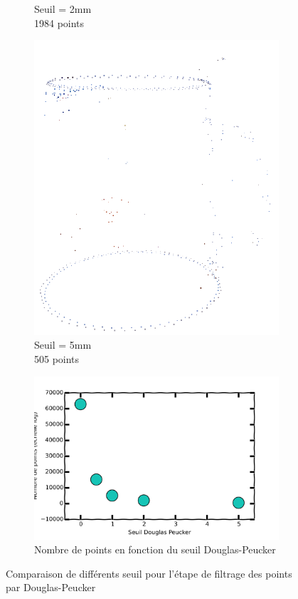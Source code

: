 \documentclass[a4paper,10pt]{report}
\begin{document}
\begin{figure}[h!]
\begin{subfigure}[b]{0.3\textwidth}
        \caption{Seuil = 2mm\\1984 points}
    \end{subfigure}
    \begin{subfigure}[b]{0.3\textwidth}
	    \includegraphics[width=\textwidth]{results/dp5-pointcloud.png}
        \caption{Seuil = 5mm\\505 points}
    \end{subfigure}
    \begin{subfigure}[b]{0.3\textwidth}
	    \includegraphics[width=\textwidth]{results/dp-points-graph.png}
        \caption{Nombre de points en fonction du seuil Douglas-Peucker}
    \end{subfigure}
    \caption{Comparaison de différents seuil pour l'étape de filtrage des points par Douglas-Peucker}
\end{figure}
\end{document}

